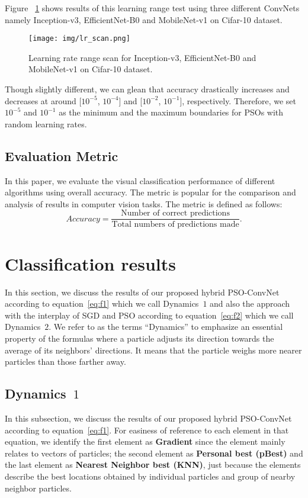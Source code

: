 \documentclass{ieeeaccess}
\begin{document}
Figure ~\ref{fig:lr_scan} shows results of this learning range test using three different ConvNets namely Inception-v3, EfficientNet-B0 and MobileNet-v1 on Cifar-10 dataset. 
\begin{figure}[htbp!]
\begin{center}
\texttt{[image: img/lr\_scan.png]}
\caption{Learning rate range scan for Inception-v3, EfficientNet-B0 and MobileNet-v1 on Cifar-10 dataset.}
\label{fig:lr_scan}
\end{center}
\end{figure}
Though slightly different, we can glean that accuracy drastically increases and decreases at around [$10^{-5}$, $10^{-4}$] and [$10^{-2}$, $10^{-1}$], respectively. Therefore, we set $10^{-5}$ and $10^{-1}$ as the minimum and the maximum boundaries for PSOs with random learning rates.
\subsection{Evaluation Metric}
In this paper, we evaluate the visual classification performance of different algorithms using overall accuracy. The metric is popular for the comparison and analysis of results in computer vision tasks. The metric is defined as follows:
\begin{equation}
Accuracy=\frac{\mbox{Number of correct predictions}}{\mbox{Total numbers of predictions made}}.
\end{equation}
\section{Classification results}
\label{sec:results}
In this section, we discuss the results of our proposed hybrid PSO-ConvNet according to equation~\eqref{eq:f1} which we call Dynamics~$1$ and also the approach with the interplay of SGD and PSO according to equation~\eqref{eq:f2} which we call Dynamics~$2$. We refer to as the terms ``Dynamics'' to emphasize an essential property of the formulas where a particle adjusts its direction towards the average of its neighbors' directions. It means that the particle weighs more nearer particles than those farther away.
\subsection{Dynamics~$1$}
In this subsection, we discuss the results of our proposed hybrid PSO-ConvNet according to equation~\eqref{eq:f1}. For easiness of reference to each element in that equation, we identify the first element as \textbf{Gradient} since the element mainly relates to vectors of particles; the second element as \textbf{Personal best (pBest)} and the last element as \textbf{Nearest Neighbor best (KNN)}, just because the elements describe the best locations obtained by individual particles and group of nearby neighbor particles.
\end{document}
